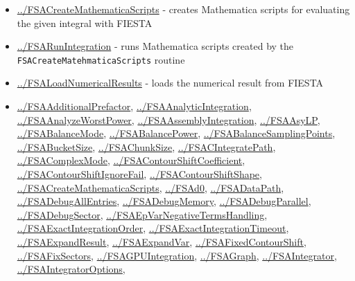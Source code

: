 \documentclass[../FeynHelpersManual.tex]{subfiles}
\begin{document}
\begin{itemize}
\tightlist
\item
  \hyperlink{../fsacreatemathematicascripts}{../FSACreateMathematicaScripts}
  - creates Mathematica scripts for evaluating the given integral with
  FIESTA
\item
  \hyperlink{../fsarunintegration}{../FSARunIntegration} - runs
  Mathematica scripts created by the
  \texttt{FSACreateMatehmaticaScripts} routine
\item
  \hyperlink{../fsaloadnumericalresults}{../FSALoadNumericalResults} -
  loads the numerical result from FIESTA
\item
  \hyperlink{../fsaadditionalprefactor}{../FSAAdditionalPrefactor},
  \hyperlink{../fsaanalyticintegration}{../FSAAnalyticIntegration},
  \hyperlink{../fsaanalyzeworstpower}{../FSAAnalyzeWorstPower},
  \hyperlink{../fsaassemblyintegration}{../FSAAssemblyIntegration},
  \hyperlink{../fsaasylp}{../FSAAsyLP},
  \hyperlink{../fsabalancemode}{../FSABalanceMode},
  \hyperlink{../fsabalancepower}{../FSABalancePower},
  \hyperlink{../fsabalancesamplingpoints}{../FSABalanceSamplingPoints},
  \hyperlink{../fsabucketsize}{../FSABucketSize},
  \hyperlink{../fsachunksize}{../FSAChunkSize},
  \hyperlink{../fsacintegratepath}{../FSACIntegratePath},
  \hyperlink{../fsacomplexmode}{../FSAComplexMode},
  \hyperlink{../fsacontourshiftcoefficient}{../FSAContourShiftCoefficient},
  \hyperlink{../fsacontourshiftignorefail}{../FSAContourShiftIgnoreFail},
  \hyperlink{../fsacontourshiftshape}{../FSAContourShiftShape},
  \hyperlink{../fsacreatemathematicascripts}{../FSACreateMathematicaScripts},
  \hyperlink{../fsad0}{../FSAd0},
  \hyperlink{../fsadatapath}{../FSADataPath},
  \hyperlink{../fsadebugallentries}{../FSADebugAllEntries},
  \hyperlink{../fsadebugmemory}{../FSADebugMemory},
  \hyperlink{../fsadebugparallel}{../FSADebugParallel},
  \hyperlink{../fsadebugsector}{../FSADebugSector},
  \hyperlink{../fsaepvarnegativetermshandling}{../FSAEpVarNegativeTermsHandling},
  \hyperlink{../fsaexactintegrationorder}{../FSAExactIntegrationOrder},
  \hyperlink{../fsaexactintegrationtimeout}{../FSAExactIntegrationTimeout},
  \hyperlink{../fsaexpandresult}{../FSAExpandResult},
  \hyperlink{../fsaexpandvar}{../FSAExpandVar},
  \hyperlink{../fsafixedcontourshift}{../FSAFixedContourShift},
  \hyperlink{../fsafixsectors}{../FSAFixSectors},
  \hyperlink{../fsagpuintegration}{../FSAGPUIntegration},
  \hyperlink{../fsagraph}{../FSAGraph},
  \hyperlink{../fsaintegrator}{../FSAIntegrator},
  \hyperlink{../fsaintegratoroptions}{../FSAIntegratorOptions},

\end{itemize}
\end{document}
